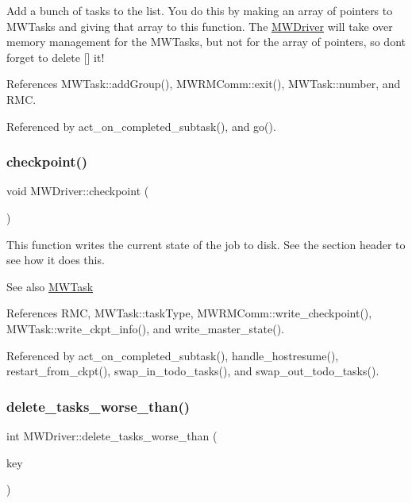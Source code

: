 Add a bunch of tasks to the list. You do this by making an array of pointers to M\+W\+Tasks and giving that array to this function. The \hyperlink{classMWDriver}{M\+W\+Driver} will take over memory management for the M\+W\+Tasks, but not for the array of pointers, so don\textquotesingle{}t forget to delete \mbox{[}\mbox{]} it! 

References M\+W\+Task\+::add\+Group(), M\+W\+R\+M\+Comm\+::exit(), M\+W\+Task\+::number, and R\+MC.



Referenced by act\+\_\+on\+\_\+completed\+\_\+subtask(), and go().

\mbox{\label{classMWDriver_ad41bdc32bc2f56f7816810bc4d260db2}} 
\subsubsection{\texorpdfstring{checkpoint()}{checkpoint()}}
{\footnotesize\ttfamily void M\+W\+Driver\+::checkpoint (\begin{DoxyParamCaption}{ }\end{DoxyParamCaption})}

This function writes the current state of the job to disk. See the section header to see how it does this. \begin{DoxySeeAlso}{See also}
\hyperlink{classMWTask}{M\+W\+Task} 
\end{DoxySeeAlso}


References R\+MC, M\+W\+Task\+::task\+Type, M\+W\+R\+M\+Comm\+::write\+\_\+checkpoint(), M\+W\+Task\+::write\+\_\+ckpt\+\_\+info(), and write\+\_\+master\+\_\+state().



Referenced by act\+\_\+on\+\_\+completed\+\_\+subtask(), handle\+\_\+hostresume(), restart\+\_\+from\+\_\+ckpt(), swap\+\_\+in\+\_\+todo\+\_\+tasks(), and swap\+\_\+out\+\_\+todo\+\_\+tasks().

\mbox{\label{classMWDriver_ae4c5921926e8780642d1b7dacf1a7016}} 
\subsubsection{\texorpdfstring{delete\+\_\+tasks\+\_\+worse\+\_\+than()}{delete\_tasks\_worse\_than()}}
{\footnotesize\ttfamily int M\+W\+Driver\+::delete\+\_\+tasks\+\_\+worse\+\_\+than (\begin{DoxyParamCaption}\item[{M\+W\+Key}]{key }\end{DoxyParamCaption})}

